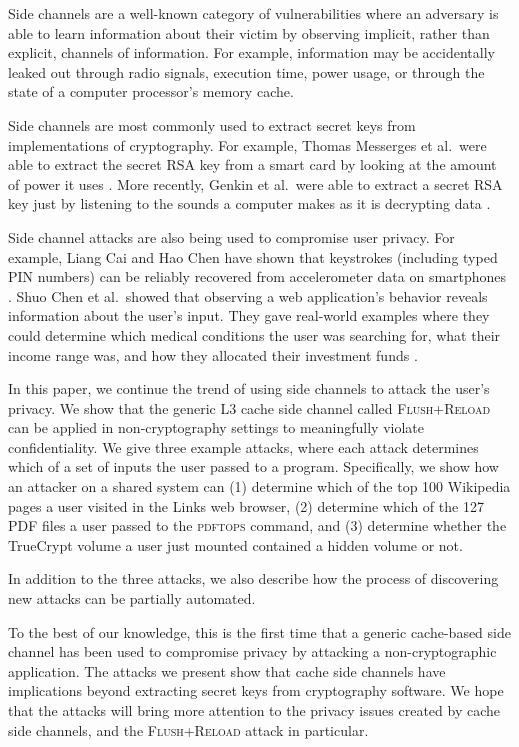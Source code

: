 \documentclass[letterpaper,twocolumn,10pt]{article}
\begin{document}
Side channels are a well-known category of vulnerabilities where an adversary is
able to learn information about their victim by observing implicit, rather than
explicit, channels of information. For example, information may be accidentally
leaked out through radio signals, execution time, power usage, or through the
state of a computer processor's memory cache.

Side channels are most commonly used to extract secret keys from implementations
of cryptography. For example, Thomas Messerges et al.\ were able to extract the
secret RSA key from a smart card by looking at the amount of power it uses
\cite{messerges1999power}. More recently, Genkin et al.\ were able to extract
a secret RSA key just by listening to the sounds a computer makes as it is
decrypting data \cite{genkin2013rsa}. 

Side channel attacks are also being used to compromise user privacy. For
example, Liang Cai and Hao Chen have shown that keystrokes (including typed PIN
numbers) can be reliably recovered from accelerometer data on smartphones
\cite{cai2012practicality}. Shuo Chen et al.\ showed that observing a web
application's behavior reveals information about the user's input. They gave
real-world examples where they could determine which medical conditions the user
was searching for, what their income range was, and how they allocated their
investment funds \cite{chen2010side}.

In this paper, we continue the trend of using side channels to attack the user's
privacy. We show that the generic L3 cache side channel called
\textsc{Flush+Reload} \cite{yarom2013flush} can be applied in non-cryptography
settings to meaningfully violate confidentiality. We give three example attacks,
where each attack determines which of a set of inputs the user passed to
a program. Specifically, we show how an attacker on a shared system can (1)
determine which of the top 100 Wikipedia pages a user visited in the Links web
browser, (2) determine which of the 127 PDF files a user passed to the
\textsc{pdftops} command, and (3) determine whether the TrueCrypt volume a user
just mounted contained a hidden volume or not.

In addition to the three attacks, we also describe how the process of
discovering new attacks can be partially automated.

To the best of our knowledge, this is the first time that a generic cache-based
side channel has been used to compromise privacy by attacking
a non-cryptographic application. The attacks we present show that cache side
channels have implications beyond extracting secret keys from cryptography
software. We hope that the attacks will bring more attention to the privacy
issues created by cache side channels, and the \textsc{Flush+Reload} attack in
particular.
\end{document}
